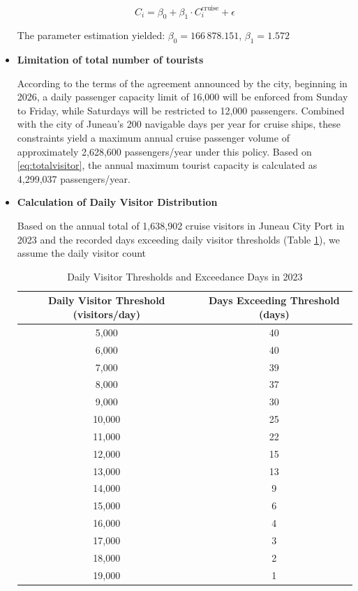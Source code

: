 \documentclass{mcmthesis}
\begin{document}
\begin{itemize}
\begin{equation}
  \label{eq:totalvisitor}
C_i = \beta_0 + \beta_1 \cdot C_i^{\text{cruise}} + \epsilon
\end{equation}

The parameter estimation yielded:  
\(\beta_0 = 166\,878.151\), \(\beta_1 = 1.572\)
\item \textbf{Limitation of total number of tourists}\par
According to the terms of the agreement announced by the city, beginning in 2026, a daily passenger capacity limit of 16,000 will be enforced from Sunday to Friday, while Saturdays will be restricted to 12,000 passengers.  
Combined with the city of Juneau's 200 navigable days per year for cruise ships, these constraints yield a maximum annual cruise passenger volume of approximately 2,628,600 passengers/year under this policy. Based on \eqref{eq:totalvisitor}, the annual maximum tourist capacity is calculated as 4,299,037 passengers/year.
  \item \textbf{Calculation of Daily Visitor Distribution}\par
  Based on the annual total of 1,638,902 cruise visitors in Juneau City Port in 2023 and the recorded days exceeding daily visitor thresholds (Table \ref{tab:threshold}), we assume the daily visitor count
  \begin{table}[h!]
    \centering
    \begin{tabular}{cc}
      \toprule
      \rowcolor{gray!20} %
      \textbf{Daily Visitor Threshold (visitors/day)} & \textbf{Days Exceeding Threshold (days)} \\
      \midrule
      5,000  & 40 \\
      6,000  & 40 \\
      7,000  & 39 \\
      8,000  & 37 \\
      9,000  & 30 \\
      10,000 & 25 \\
      11,000 & 22 \\
      12,000 & 15 \\
      13,000 & 13 \\
      14,000 & 9  \\
      15,000 & 6  \\
      16,000 & 4  \\
      17,000 & 3  \\
      18,000 & 2  \\
      19,000 & 1  \\
      \bottomrule
    \end{tabular}
    \caption{Daily Visitor Thresholds and Exceedance Days in 2023}
    \label{tab:threshold} %
\end{table}


\end{itemize}
\end{document}
